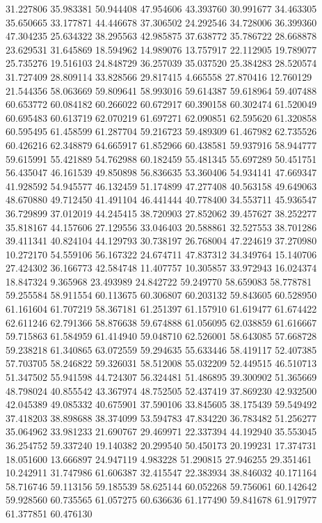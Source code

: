 31.227806
35.983381
50.944408
47.954606
43.393760
30.991677
34.463305
35.650665
33.177871
44.446678
37.306502
24.292546
34.728006
36.399360
47.304235
25.634322
38.295563
42.985875
37.638772
35.786722
28.668878
23.629531
31.645869
18.594962
14.989076
13.757917
22.112905
19.789077
25.735276
19.516103
24.848729
36.257039
35.037520
25.384283
28.520574
31.727409
28.809114
33.828566
29.817415
4.665558
27.870416
12.760129
21.544356
58.063669
59.809641
58.993016
59.614387
59.618964
59.407488
60.653772
60.084182
60.266022
60.672917
60.390158
60.302474
61.520049
60.695483
60.613719
62.070219
61.697271
62.090851
62.595620
61.320858
60.595495
61.458599
61.287704
59.216723
59.489309
61.467982
62.735526
60.426216
62.348879
64.665917
61.852966
60.438581
59.937916
58.944777
59.615991
55.421889
54.762988
60.182459
55.481345
55.697289
50.451751
56.435047
46.161539
49.850898
56.836635
53.360406
54.934141
47.669347
41.928592
54.945577
46.132459
51.174899
47.277408
40.563158
49.649063
48.670880
49.712450
41.491104
46.441444
40.778400
34.553711
45.936547
36.729899
37.012019
44.245415
38.720903
27.852062
39.457627
38.252277
35.818167
44.157606
27.129556
33.046403
20.588861
32.527553
38.701286
39.411341
40.824104
44.129793
30.738197
26.768004
47.224619
37.270980
10.272170
54.559106
56.167322
24.674711
47.837312
34.349764
15.140706
27.424302
36.166773
42.584748
11.407757
10.305857
33.972943
16.024374
18.847324
9.365968
23.493989
24.842722
59.249770
58.659083
58.778781
59.255584
58.911554
60.113675
60.306807
60.203132
59.843605
60.528950
61.161604
61.707219
58.367181
61.251397
61.157910
61.619477
61.674422
62.611246
62.791366
58.876638
59.674888
61.056095
62.038859
61.616667
59.715863
61.584959
61.414940
59.048710
62.526001
58.643085
57.668728
59.238218
61.340865
63.072559
59.294635
55.633446
58.419117
52.407385
57.703705
58.246822
59.326031
58.512008
55.032209
52.449515
46.510713
51.347502
55.941598
44.724307
56.324481
51.486895
39.300902
51.365669
48.798024
40.855542
43.367974
48.752505
52.437419
37.869230
42.932500
42.045389
49.085332
40.675901
37.590106
33.845605
38.175439
59.549492
37.418203
38.898688
38.374099
53.594783
47.834220
36.783482
51.256277
35.064962
33.981233
21.690767
29.469971
22.337394
44.192940
35.553045
36.254752
59.337240
19.140382
20.299540
50.450173
20.199231
17.374731
18.051600
13.666897
24.947119
4.983228
51.290815
27.946255
29.351461
10.242911
31.747986
61.606387
32.415547
22.383934
38.846032
40.171164
58.716746
59.113156
59.185539
58.625144
60.052268
59.756061
60.142642
59.928560
60.735565
61.057275
60.636636
61.177490
59.841678
61.917977
61.377851
60.476130
